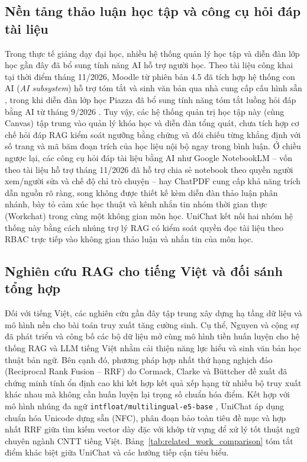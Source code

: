 \documentclass{IEEEtran}
\begin{document}
\subsection{Nền tảng thảo luận học tập và công cụ hỏi đáp tài liệu}
Trong thực tế giảng dạy đại học, nhiều hệ thống quản lý học tập và diễn đàn lớp học gần đây đã bổ sung tính năng AI hỗ trợ người học. Theo tài liệu công khai tại thời điểm tháng 11/2026, Moodle từ phiên bản 4.5 đã tích hợp hệ thống con AI (\textit{AI subsystem}) hỗ trợ tóm tắt và sinh văn bản qua nhà cung cấp cấu hình sẵn \cite{moodle_ai}, trong khi diễn đàn lớp học Piazza đã bổ sung tính năng tóm tắt luồng hỏi đáp bằng AI từ tháng 9/2026 \cite{piazza_ai}. Tuy vậy, các hệ thống quản trị học tập này (cùng Canvas) tập trung vào quản lý khóa học và diễn đàn tổng quát, chưa tích hợp cơ chế hỏi đáp RAG kiểm soát ngưỡng bằng chứng và đối chiếu từng khẳng định với số trang và mã băm đoạn trích của học liệu nội bộ ngay trong bình luận. Ở chiều ngược lại, các công cụ hỏi đáp tài liệu bằng AI như Google NotebookLM -- vốn theo tài liệu hỗ trợ tháng 11/2026 đã hỗ trợ chia sẻ notebook theo quyền người xem/người sửa và chế độ chỉ trò chuyện \cite{notebooklm_share} -- hay ChatPDF cung cấp khả năng trích dẫn nguồn rõ ràng, song không được thiết kế kèm diễn đàn thảo luận phân nhánh, bày tỏ cảm xúc học thuật và kênh nhắn tin nhóm thời gian thực (Workchat) trong cùng một không gian môn học. UniChat kết nối hai nhóm hệ thống này bằng cách nhúng trợ lý RAG có kiểm soát quyền đọc tài liệu theo RBAC trực tiếp vào không gian thảo luận và nhắn tin của môn học.

\subsection{Nghiên cứu RAG cho tiếng Việt và đối sánh tổng hợp}
Đối với tiếng Việt, các nghiên cứu gần đây tập trung xây dựng hạ tầng dữ liệu và mô hình nền cho bài toán truy xuất tăng cường sinh. Cụ thể, Nguyen và cộng sự \cite{nguyen2024virag} đã phát triển và công bố các bộ dữ liệu mở cùng mô hình tiền huấn luyện cho hệ thống RAG và LLM tiếng Việt nhằm cải thiện năng lực hiểu và sinh văn bản học thuật bản ngữ. Bên cạnh đó, phương pháp hợp nhất thứ hạng nghịch đảo (Reciprocal Rank Fusion -- RRF) do Cormack, Clarke và Büttcher đề xuất \cite{cormack2009rrf} đã chứng minh tính ổn định cao khi kết hợp kết quả xếp hạng từ nhiều bộ truy xuất khác nhau mà không cần huấn luyện lại trọng số chuẩn hóa điểm. Kết hợp với mô hình nhúng đa ngữ \texttt{intfloat/multilingual-e5-base} \cite{wang2024multilinguale5}, UniChat áp dụng chuẩn hóa Unicode dựng sẵn (NFC), phân đoạn bảo toàn tiêu đề mục và hợp nhất RRF giữa tìm kiếm vector dày đặc với khớp từ vựng để xử lý tốt thuật ngữ chuyên ngành CNTT tiếng Việt. Bảng~\ref{tab:related_work_comparison} tóm tắt điểm khác biệt giữa UniChat và các hướng tiếp cận tiêu biểu.
\end{document}
